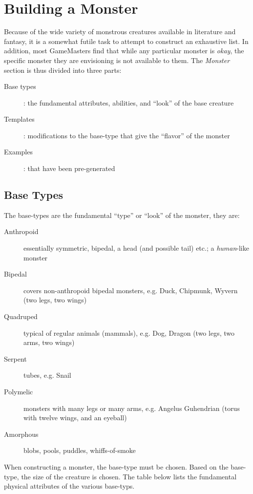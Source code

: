 \section{Building a Monster}

Because of the wide variety of monstrous creatures available in
literature and fantasy, it is a somewhat futile task to attempt to
construct an exhaustive list. In addition, most GameMasters find that
while any particular monster is \emph{okay}, the specific monster they
are envisioning is not available to them. The \emph{Monster} section
is thus divided into three parts:

\begin{description}
\item[Base types]: the fundamental attributes, abilities, and ``look''
  of the base creature
\item[Templates]: modifications to the base-type that give the
  ``flavor'' of the monster
\item[Examples]: that have been pre-generated
\end{description}

\subsection{Base Types}

The base-types are the fundamental ``type'' or ``look'' of the
monster, they are:

\begin{description}
\item[Anthropoid] essentially symmetric, bipedal, a head (and possible
  tail) etc.; a \emph{human}-like monster
\item[Bipedal] covers non-anthropoid bipedal monsters, e.g. Duck,
  Chipmunk, Wyvern (two legs, two wings)
\item[Quadruped] typical of regular animals (mammals), e.g. Dog,
  Dragon (two legs, two arms, two wings)
\item[Serpent] tubes, e.g. Snail
\item[Polymelic] monsters with many legs or many arms, e.g. Angelus
  Guhendrian (torus with twelve wings, and an eyeball)
\item[Amorphous] blobs, pools, puddles, whiffs-of-smoke 
\end{description}

When constructing a monster, the base-type must be chosen. Based on
the base-type, the size of the creature is chosen. The table below
lists the fundamental physical attributes of the various base-typs.

